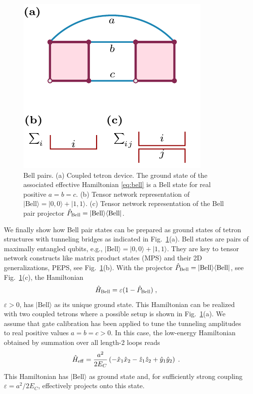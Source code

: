 \documentclass[twocolumn,floats,prx,showpacs]{revtex4-1}
\newcommand{\ket}[1]{|#1\rangle}
\newcommand{\bra}[1]{\langle#1|}
\begin{document}
\begin{figure}
\includegraphics[width=0.66\columnwidth]{fig/bellplus.pdf}
\caption{Bell pairs. (a) Coupled tetron device. The ground state of the associated effective Hamiltonian \eqref{eq:bell} is a Bell state
for real positive $a=b=c$. (b) Tensor network representation of $\ket{\text{Bell}}=\ket{0,0}+\ket{1,1}$. (c) Tensor network representation of the Bell pair projector $\hat P_{\rm Bell}=\ket{\text{Bell}}\bra{\text{Bell}}$.}
\label{fig:bell}
\end{figure}

We finally show how Bell pair states can be prepared as ground states of tetron structures with tunneling bridges as indicated in Fig.~\ref{fig:bell}(a). 
Bell states are pairs of maximally entangled qubits, e.g., $\ket{\text{Bell}}=\ket{0,0}+\ket{1,1}$. They 
are key to tensor network constructs
like matrix product states (MPS) and their 2D generalizations, PEPS, see Fig.~\ref{fig:bell}(b).
With the projector
$\hat P_{\rm Bell} = \ket{\text{Bell}}\bra{\text{Bell}}$, see Fig.~\ref{fig:bell}(c),
the Hamiltonian 
\begin{equation}\label{eq:bellpair}
\hat H_{\rm Bell}= \varepsilon (1-\hat P_{\rm Bell})\;,
\end{equation}
 $\varepsilon>0$, 
has $\ket{\text{Bell}}$ as its unique ground state.
This Hamiltonian can be realized with two coupled tetrons where a possible setup is shown in Fig.~\ref{fig:bell}(a). We assume that gate calibration has been applied to tune the tunneling amplitudes to real positive values  $a=b=c>0$. In this case, the low-energy Hamiltonian obtained by summation over all length-2 loops reads
\begin{equation}
 \hat H_{\rm eff}= \frac{a^2}{2E_C} 
\left(  - \hat x_1 \hat x_2 - \hat z_1 \hat z_2+ \hat y_1  \hat y_2 \right) \;.  \label{eq:bell}
\end{equation}
This Hamiltonian has $\ket{\text{Bell}}$ as ground state and, for sufficiently strong coupling $\varepsilon=a^2/2E_C$, effectively projects onto this state.
\end{document}
